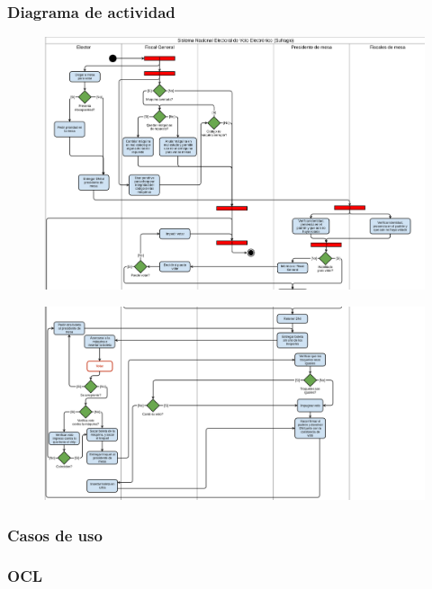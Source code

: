 \subsubsection{Diagrama de actividad}
\begin{figure}[h!]
\centering
\includegraphics[scale=0.5]{imagenes/actividad/actividadSufragio1}
\end{figure}

\begin{figure}[h!]
\centering
\includegraphics[scale=0.5]{imagenes/actividad/actividadSufragio2}
\end{figure}

\subsubsection{Casos de uso}

\subsubsection{OCL}

